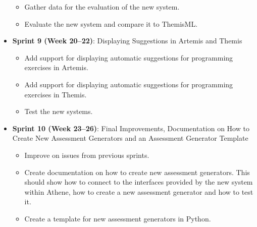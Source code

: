 \begin{itemize}
\begin{itemize}
        \item Gather data for the evaluation of the new system.
        \item Evaluate the new system and compare it to ThemisML.
    \end{itemize}
    \item \textbf{Sprint 9 (Week 20--22)}: Displaying Suggestions in Artemis and Themis
    \begin{itemize}
        \item Add support for displaying automatic suggestions for programming exercises in Artemis.
        \item Add support for displaying automatic suggestions for programming exercises in Themis.
        \item Test the new systems.
    \end{itemize}
    \item \textbf{Sprint 10 (Week 23--26)}: Final Improvements, Documentation on How to Create New Assessment Generators and an Assessment Generator Template
    \begin{itemize}
        \item Improve on issues from previous sprints.
        \item Create documentation on how to create new assessment generators. This should show how to connect to the interfaces provided by the new system within Athene, how to create a new assessment generator and how to test it.
        \item Create a template for new assessment generators in Python.
    \end{itemize}

\end{itemize}


\clearpage

\clearpage




